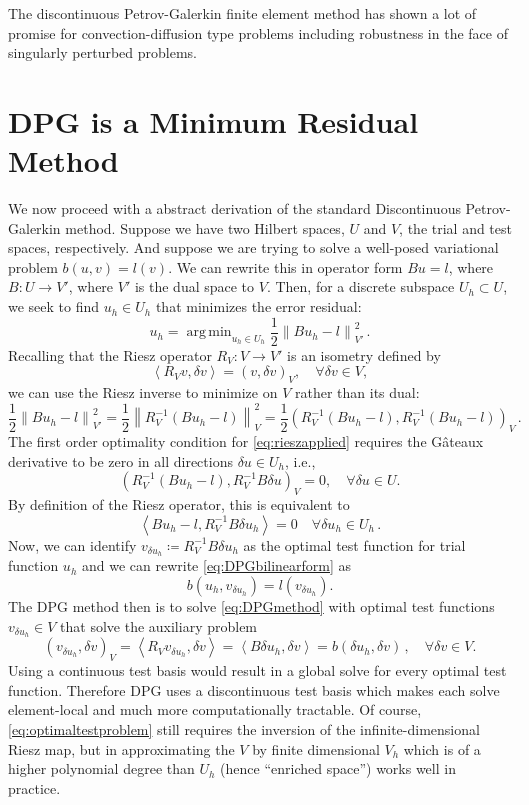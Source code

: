 \documentclass[letterpaper]{article}
\DeclareMathOperator*{\argmin}{\arg\,\min}
\newcommand{\eqnref}[1]{\eqref{eq:#1}}
\newcommand{\norm}[1]{\left\| #1 \right\|}
\newcommand{\LRp}[1]{\left( #1 \right)}
\newcommand{\LRa}[1]{\left\langle #1 \right\rangle}
\begin{document}
The discontinuous Petrov-Galerkin finite element method has shown a lot of
promise for convection-diffusion type problems including robustness in the
face of singularly perturbed problems.

\section{DPG is a Minimum Residual Method}
We now proceed with a abstract derivation of the standard Discontinuous
Petrov-Galerkin method. Suppose we have two Hilbert spaces, $U$ and $V$, the
trial and test spaces, respectively. And suppose we are trying to solve a
well-posed variational problem $b(u,v)=l(v)$. We can rewrite this in operator
form $Bu=l$, where $B:U\rightarrow V'$, where $V'$ is the dual space to $V$.
Then, for a discrete subspace $U_h\subset U$, we seek to find $u_h\in U_h$
that minimizes the error residual:
\begin{equation}
u_h=\argmin_{u_h\in U_h}\frac{1}{2}\norm{Bu_h-l}^2_{V'}\,.
\label{minresidual}
\end{equation}
Recalling that the Riesz operator $R_V:V\rightarrow V'$ is an isometry defined
by
\[
\LRa{R_Vv,\delta v}=\LRp{v,\delta v}_V,\quad\forall\delta v\in V,
\]
we can use the Riesz inverse to minimize on $V$ rather than its dual:
\begin{equation}
\frac{1}{2}\norm{Bu_h-l}^2_{V'}=\frac{1}{2}\norm{R_V^{-1}(Bu_h-l)}^2_V
=\frac{1}{2}\LRp{R_V^{-1}(Bu_h-l),R_V^{-1}(Bu_h-l)}_V\,.
\label{eq:rieszapplied}
\end{equation}
The first order optimality condition for \eqnref{rieszapplied} requires
the G\^ateaux derivative to be zero in all directions $\delta u \in
U_h$, i.e.,
\[
\left(R_V^{-1}(Bu_h-l),R_V^{-1}B\delta u\right)_V = 0, \quad \forall \delta u \in U. 
\]
By definition of the Riesz operator, this is equivalent to
\begin{equation}
\LRa{Bu_h-l,R_V^{-1}B\delta u_h}=0\quad\forall\delta u_h\in U_h\,.
\label{eq:DPGbilinearform}
\end{equation}
Now, we can identify $v_{\delta u_h}\coloneqq R_V^{-1}B\delta u_h$ as the
optimal test function for trial function $u_h$ and we can rewrite
\eqnref{DPGbilinearform} as
\begin{equation}
b(u_h,v_{\delta u_h})=l(v_{\delta u_h}).
\label{eq:DPGmethod}
\end{equation}
The DPG method then is to solve \eqnref{DPGmethod} with optimal test functions
$v_{\delta u_h}\in V$ that solve the auxiliary problem
\begin{equation}
\LRp{v_{\delta u_h},\delta v}_V=\LRa{R_Vv_{\delta u_h},\delta v}
=\LRa{B\delta u_h,\delta v}=b(\delta u_h,\delta v)\,,\quad\forall\delta v\in V.
\label{eq:optimaltestproblem}
\end{equation}
Using a continuous test basis would result in a global solve for every optimal
test function. Therefore DPG uses a discontinuous test basis which makes each
solve element-local and much more computationally tractable. Of course,
\eqnref{optimaltestproblem} still requires the inversion of the
infinite-dimensional Riesz map, but in approximating the $V$ by finite
dimensional $V_h$ which is of a higher polynomial degree than $U_h$ (hence
``enriched space'') works well in practice.
\end{document}
